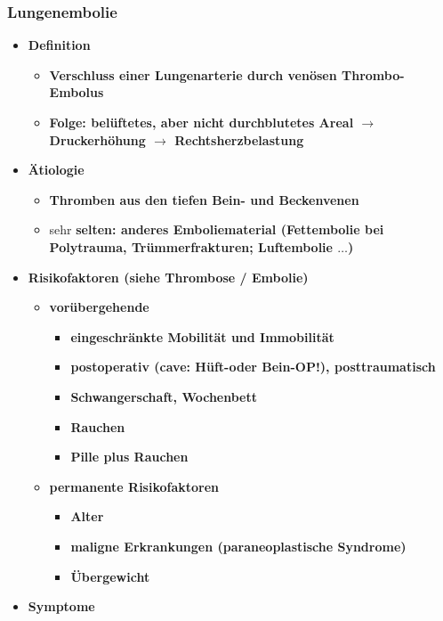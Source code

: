 	\subsubsection{Lungenembolie}
		\begin{itemize}
			\item \textbf{Definition}
				\begin{itemize}
					\item \textbf{Verschluss einer Lungenarterie durch venösen Thrombo-Embolus}
					\item \textbf{Folge: belüftetes, aber nicht durchblutetes Areal $\rightarrow$ Druckerhöhung $\rightarrow$ Rechtsherzbelastung}
				\end{itemize}
			\item \textbf{Ätiologie}
				\begin{itemize}
					\item \textbf{Thromben aus den tiefen Bein- und Beckenvenen}
					\item sehr \textbf{selten: anderes Emboliematerial (Fettembolie bei Polytrauma, Trümmerfrakturen; Luftembolie $\dots$)}
				\end{itemize}
\pagebreak
			\item \textbf{Risikofaktoren (siehe Thrombose / Embolie)}
				\begin{itemize}
					\item \textbf{vorübergehende}
						\begin{itemize}
							\item \textbf{eingeschränkte Mobilität und Immobilität}
							\item \textbf{postoperativ (cave: Hüft-oder Bein-OP!), posttraumatisch}
							\item \textbf{Schwangerschaft, Wochenbett}
							\item \textbf{Rauchen}
							\item \textbf{Pille plus Rauchen}
						\end{itemize}
					\item \textbf{permanente Risikofaktoren}
						\begin{itemize}
							\item \textbf{Alter}
							\item \textbf{maligne Erkrankungen (paraneoplastische Syndrome)}
							\item \textbf{Übergewicht}
						\end{itemize}
				\end{itemize}
			\item \textbf{Symptome}

\end{itemize}
